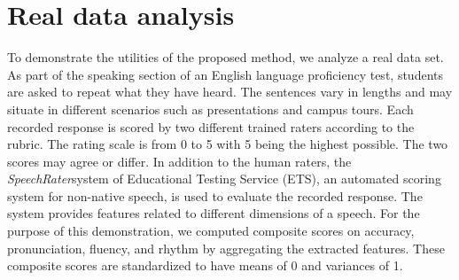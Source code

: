 \documentclass[man, floatsintext]{apa7}
\begin{document}
  \section{Real data analysis}
  To demonstrate the utilities of the proposed method, we analyze a real data
  set. As part of the speaking section of an English language proficiency test,
  students are asked to repeat what they have heard. The sentences vary in
  lengths and may situate in different scenarios such as presentations and
  campus tours. Each recorded response is scored by two different trained raters
  according to the rubric. The rating scale is from 0 to 5 with 5 being the
  highest possible. The two scores may agree or differ. In addition to the human
  raters, the \textit{SpeechRater}\texttrademark system of Educational Testing
  Service (ETS), an automated scoring system for non-native speech, is used to
  evaluate the recorded response. The system provides features related
  to different dimensions of a speech. For the purpose of this demonstration,
  we computed composite scores on accuracy, pronunciation, fluency, and rhythm
  by aggregating the extracted features. These composite scores are standardized
  to have means of 0 and variances of 1. 
\end{document}
